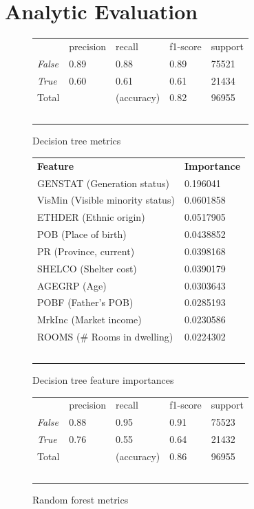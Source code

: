 \documentclass[10pt, conference, compsocconf]{IEEEtran}
\begin{document}
\section{Analytic Evaluation}


\begin{figure}
  \begin{tabular}{lllll}
  & precision & recall & f1-score & support \\
  \textit{False}  & 0.89  & 0.88  & 0.89  & 75521 \\
  \textit{True} & 0.60  & 0.61  & 0.61  & 21434 \\
  Total  &  & (accuracy) & 0.82 & 96955 \\\
  \end{tabular}
  \caption{Decision tree metrics}
  \label{fig:decision_tree_metrics}
\end{figure}

\begin{figure}
  \begin{tabular}{ll}
  \textbf{Feature} & \textbf{Importance} \\
  GENSTAT (Generation status) & 0.196041  \\
  VisMin (Visible minority status)  & 0.0601858 \\
  ETHDER (Ethnic origin)  & 0.0517905 \\
  POB (Place of birth)  & 0.0438852 \\
  PR (Province, current)  & 0.0398168 \\
  SHELCO (Shelter cost) & 0.0390179 \\
  AGEGRP (Age)  & 0.0303643 \\
  POBF (Father's POB) & 0.0285193 \\
  MrkInc (Market income)  & 0.0230586 \\
  ROOMS (\# Rooms in dwelling)  & 0.0224302 \\\       
  \end{tabular}
  \caption{Decision tree feature importances}
  \label{fig:decision_tree_importances}
\end{figure}

\begin{figure}
  \begin{tabular}{lllll}
    & precision & recall & f1-score & support \\
  \textit{False} & 0.88 & 0.95  & 0.91  & 75523 \\
  \textit{True} & 0.76  & 0.55  & 0.64 & 21432 \\
  Total  &  & (accuracy) & 0.86 & 96955 \\\
  \end{tabular}
  \caption{Random forest metrics}
  \label{fig:random_forest_metrics}
\end{figure}
\end{document}
